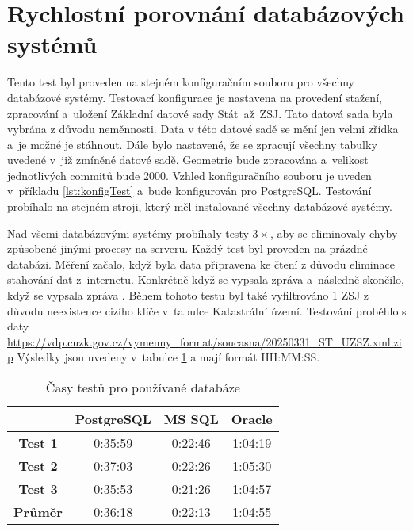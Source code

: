 \section{Rychlostní porovnání databázových systémů}
Tento test byl proveden na stejném konfiguračním souboru pro všechny databázové systémy.
Testovací konfigurace je nastavena na provedení stažení, zpracování a~uložení Základní datové sady Stát~až~ZSJ.
Tato datová sada byla vybrána z důvodu neměnnosti. 
Data v této datové sadě se mění jen velmi zřídka a~je možné je stáhnout.
Dále bylo nastavené, že se zpracují všechny tabulky uvedené v~již zmíněné datové sadě.
Geometrie bude zpracována a~velikost jednotlivých commitů bude 2000.
Vzhled konfiguračního souboru je uveden v~příkladu \ref{lst:konfigTest} a~bude konfigurován pro PostgreSQL.
Testování probíhalo na stejném stroji, který měl instalované všechny databázové systémy.

Nad všemi databázovými systémy probíhaly testy \(3\times\), aby se eliminovaly chyby způsobené jinými procesy na serveru.
Každý test byl proveden na prázdné databázi.
Měření začalo, když byla data připravena ke čtení z důvodu eliminace stahování dat z~internetu.
Konkrétně když se vypsala zpráva  a~následně skončilo, když se 
vypsala zpráva .
Během tohoto testu byl také vyfiltrováno 1 ZSJ z důvodu neexistence cizího klíče v~tabulce Katastrální území.
Testování proběhlo s daty \url{https://vdp.cuzk.gov.cz/vymenny_format/soucasna/20250331_ST_UZSZ.xml.zip}
Výsledky jsou uvedeny v~tabulce \ref{tab:test1} a mají formát HH:MM:SS.

\begin{table}[!h]
  \centering
  \caption{Časy testů pro používané databáze}
  \label{tab:test1}
  \begin{tabular}{|c|c|c|c|}
  \hline
                  & \textbf{PostgreSQL} & \textbf{MS SQL} & \textbf{Oracle} \\ \hline
  \textbf{Test 1} & 0:35:59             & 0:22:46         & 1:04:19         \\ \hline
  \textbf{Test 2} & 0:37:03             & 0:22:26         & 1:05:30         \\ \hline
  \textbf{Test 3} & 0:35:53             & 0:21:26         & 1:04:57         \\ \hline
  \textbf{Průměr} & 0:36:18             & 0:22:13         & 1:04:55         \\ \hline
  \end{tabular}
\end{table}


